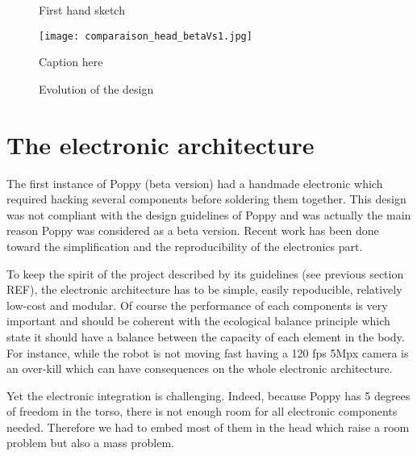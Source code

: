 \begin{figure}[tb]
\centering
    \hfil
    \caption{First hand sketch}
    \label{fig:head_sketch}
\end{figure}


\begin{figure}[tb]
    \begin{center}
        \texttt{[image: comparaison\_head\_betaVs1.jpg]}
    \end{center}
    \caption{Caption here}
    \label{fig:figure1}
\end{figure}


\begin{figure}[tb]
\centering
    \hfil
    \hfil
    \caption{Evolution of the design}
    \label{fig:head_evolution}
\end{figure}




\section{The electronic architecture} %

The first instance of Poppy (beta version) had a handmade electronic which required hacking several components before soldering them together. This design was not compliant with the design guidelines of Poppy and was actually the main reason Poppy was considered as a beta version. Recent work has been done toward the simplification and the reproducibility of the electronics part.


To keep the spirit of the project described by its guidelines (see previous section REF), the electronic architecture has to be simple, easily repoducible, relatively low-cost and modular. Of course the performance of each components is very important and should be coherent with the ecological balance principle which state it should have a balance between the capacity of each element in the body. For instance, while the robot is not moving fast having a 120 fps 5Mpx camera is an over-kill which can have consequences on the whole electronic architecture.

Yet the electronic integration is challenging. Indeed, because Poppy has 5 degrees of freedom in the torso, there is not enough room for all electronic components needed. Therefore we had to embed most of them in the head which raise a room problem but also a mass problem.

